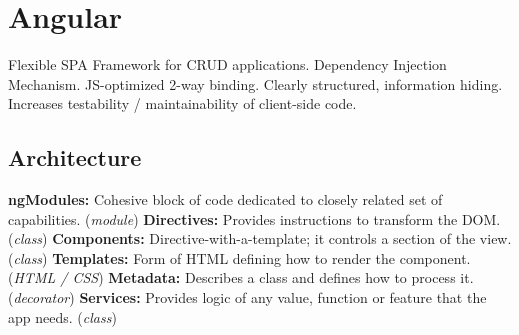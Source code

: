 
\section{Angular}
Flexible SPA Framework for CRUD applications.
Dependency Injection Mechanism.
JS-optimized 2-way binding.
Clearly structured, information hiding.
Increases testability / maintainability of client-side code.

\subsection{Architecture}
\textbf{ngModules:} Cohesive block of code dedicated to closely related set of capabilities. (\textit{module})
\textbf{Directives:} Provides instructions to transform the DOM. (\textit{class})
\textbf{Components:} Directive-with-a-template; it controls a section of the view. (\textit{class})
\textbf{Templates:} Form of HTML defining how to render the component. (\textit{HTML / CSS})
\textbf{Metadata:} Describes a class and defines how to process it. (\textit{decorator})
\textbf{Services:} Provides logic of any value, function or feature that the app needs. (\textit{class})

